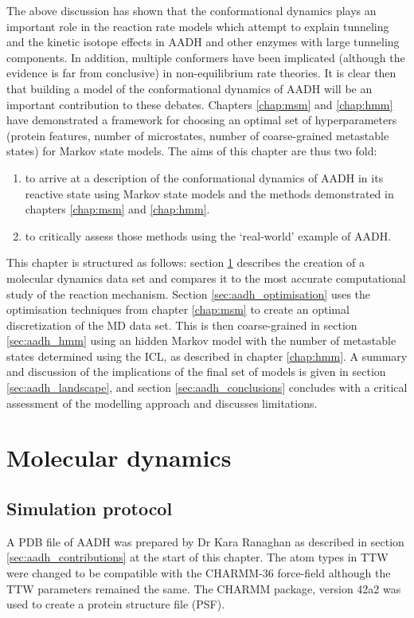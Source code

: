 The above discussion has shown that the conformational dynamics plays an important role in the reaction rate models which attempt to explain tunneling and the kinetic isotope effects in AADH and other enzymes with large tunneling components. In addition, multiple conformers have been implicated (although the evidence is far from conclusive) in non-equilibrium rate theories.  It is clear then that building a model of the conformational dynamics of AADH will be an important contribution to these debates. Chapters \ref{chap:msm} and \ref{chap:hmm}  have demonstrated a framework for choosing an optimal set of hyperparameters (protein features, number of microstates, number of coarse-grained metastable states) for Markov state models.  The aims of this chapter are thus two fold: 
\begin{enumerate}
    \item to arrive at a description of the conformational dynamics of AADH in its reactive state using Markov state models and the methods demonstrated in chapters \ref{chap:msm} and \ref{chap:hmm}. 
    \item to critically assess those methods using the `real-world' example of AADH. 
\end{enumerate}

This chapter is structured as follows: section \ref{sec:aadh_md} describes the creation of a molecular dynamics data set and compares it to the most accurate computational study of the reaction mechanism. Section \ref{sec:aadh_optimisation} uses the optimisation techniques from chapter \ref{chap:msm} to create an optimal discretization of the MD data set. This is then coarse-grained in section \ref{sec:aadh_hmm} using an hidden Markov model with the number of metastable states determined using the ICL, as described in chapter \ref{chap:hmm}. A summary and discussion of the implications of the final set of models is given in section \ref{sec:aadh_landscape}, and section \ref{sec:aadh_conclusions} concludes with a critical assessment of the modelling approach and discusses limitations. 

\section{Molecular dynamics}\label{sec:aadh_md}

\subsection{Simulation protocol}
A PDB file of AADH was prepared by Dr Kara Ranaghan as described in section \ref{sec:aadh_contributions} at the start of this chapter. The atom types in TTW were changed to be compatible with the CHARMM-36 \cite{huangCHARMM36AllatomAdditive2013} force-field although the TTW parameters remained the same. The CHARMM package, version 42a2 \cite{brooksCHARMMBiomolecularSimulation2009} was used to create a protein structure file (PSF). 


